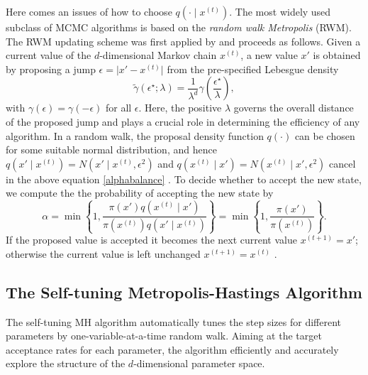 Here comes an issues of how to choose $q\left(\cdot\mid x^{(t)}\right)$. The most widely used subclass of MCMC algorithms is based on the \textit{random walk Metropolis} (RWM). The RWM updating scheme was first applied by \cite{metropolis1953equation} and proceeds as follows. Given a current value of the $d$-dimensional Markov chain $x^{(t)}$, a new value $x'$ is obtained by proposing a jump $\epsilon = \lvert x' - x^{(t)} \rvert  $ from the pre-specified Lebesgue density 
\begin{equation}\label{stepsizeep}
\tilde{\gamma}\left(\epsilon^\star;\lambda\right) = \frac{1}{\lambda^d}\gamma \left( \frac{\epsilon^\star}{\lambda} \right),
\end{equation}
with $\gamma(\epsilon) = \gamma(-\epsilon)$ for all $\epsilon$. Here, the positive $\lambda$ governs the overall distance of the proposed jump and plays a crucial role in determining the efficiency of any algorithm. In a random walk, the proposal density function $q(\cdot)$ can be chosen for some suitable normal distribution, and hence $q\left(x'\mid x^{\left(t\right)}\right)=N\left(x'\mid x^{\left(t\right)},\epsilon^2\right)$ and $q\left(x^{\left(t\right)}\mid x'\right)=N\left(x^{\left(t\right)}\mid x',\epsilon^2\right)$ cancel in the above equation \eqref{alphabalance} \citep{sherlock2016adaptive}. To decide whether to accept the new state, we compute the the probability of accepting the new state by 
\begin{equation}
\alpha=\min \left\lbrace 1,\frac{\pi\left(x'\right) q\left( x^{\left(t\right)}\mid x'\right) }{\pi\left(x^{\left(t\right)}\right)  q\left( x'\mid x^{\left(t\right)} \right) }  \right\rbrace= \min \left\lbrace 1,\frac{\pi\left(x'\right)  }{\pi\left(x^{\left(t\right)}\right) }  \right\rbrace.
\end{equation}
If the proposed value is accepted it becomes the next current value $x^{(t+1)}= x'$; otherwise the current value is left unchanged $x^{(t+1)} = x^{(t)}$ \citep{sherlock2010random}. 


\subsection{The Self-tuning Metropolis-Hastings Algorithm}

The self-tuning MH algorithm automatically tunes the step sizes for different parameters by one-variable-at-a-time random walk. Aiming at the target acceptance rates for each parameter, the algorithm efficiently and accurately explore the structure of the $d$-dimensional parameter space. 

